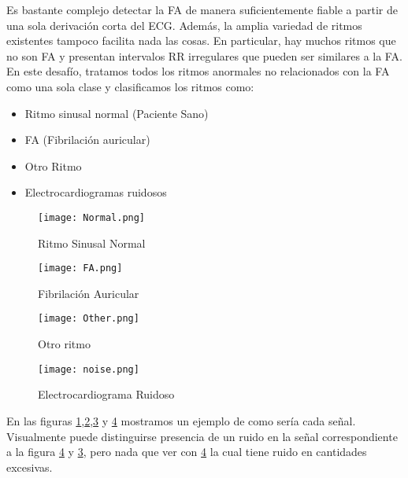     Es bastante complejo detectar la FA de manera suficientemente fiable a partir de una sola derivación corta del ECG. Además, la amplia variedad de ritmos existentes tampoco facilita nada las cosas. En particular, hay muchos ritmos que no son FA y presentan intervalos RR irregulares que pueden ser similares a la FA. En este desafío, tratamos todos los ritmos anormales no relacionados con la FA como una sola clase y clasificamos los ritmos como: \\
        
        \begin{itemize}
            \item Ritmo sinusal normal (Paciente Sano)
            \item FA (Fibrilación auricular)
            \item Otro Ritmo
            \item Electrocardiogramas ruidosos
        \end{itemize}
        
        \begin{figure}[H]
            \centering
            \texttt{[image: Normal.png]}
            \caption{Ritmo Sinusal Normal}
            \label{fig:normal}
        \end{figure}
        
        
        \begin{figure}[H]
            \centering
            \texttt{[image: FA.png]}
            \caption{Fibrilación Auricular}
            \label{fig:af}
        \end{figure}
        
        \begin{figure}[H]
            \centering
            \texttt{[image: Other.png]}
            \caption{Otro ritmo}
            \label{fig:other}
        \end{figure}
        
        \begin{figure}[H]
            \centering
            \texttt{[image: noise.png]}
            \caption{Electrocardiograma Ruidoso}
            \label{fig:noise}
        \end{figure}
        

        En las figuras \ref{fig:normal},\ref{fig:af},\ref{fig:other} y \ref{fig:noise} mostramos un ejemplo de como sería cada señal. Visualmente puede distinguirse presencia de un ruido en la señal correspondiente a la figura \ref{fig:noise} y \ref{fig:other}, pero nada que ver con \ref{fig:noise} la cual tiene ruido en cantidades excesivas. \\
        
